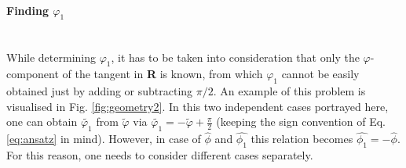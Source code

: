 \paragraph{Finding $\varphi_1$}\mbox{}\\
While determining $\varphi_1$, it has to be taken into consideration that only the $\varphi$-component of the tangent in \textbf{R} is known, from which $\varphi_1$ cannot be easily obtained just by adding or subtracting $\pi/2$. An example of this problem is visualised in Fig. \ref{fig:geometry2}. In this two independent cases portrayed here, one can obtain $\tilde{\varphi_1}$ from $\tilde{\varphi}$ via $\tilde{\varphi_1}=-\tilde{\varphi}+\frac{\pi}{2}$ (keeping the sign convention of Eq. \ref{eq:ansatz} in mind). However, in case of $\hat{\phi}$ and $\hat{\phi_1}$ this relation becomes $\hat{\phi_1} = -\hat{\phi}$. For this reason, one needs to consider different cases separately.
